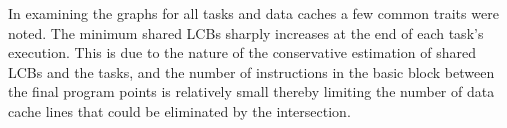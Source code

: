 %
%
%
%
%
%
%
%
%
%
%
%
%
%

In examining the graphs for all tasks and data caches a few common traits were noted. The minimum shared LCBs sharply increases at the end of each task's execution. This is due to the nature of the conservative estimation of shared LCBs and the tasks, and the number of instructions in the basic block between the final program points is relatively small thereby limiting the number of data cache lines that could be eliminated by the intersection.
%

